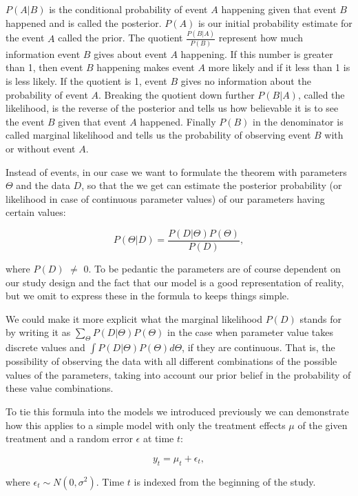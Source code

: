 \documentclass[12pt,a4paper,leqno]{report}
\theoremstyle{plain}
\theoremstyle{definition}
\theoremstyle{remark}
\begin{document}
\(P(A|B)\) is the conditional probability of event \(A\) happening given that event \(B\) happened and is
called the posterior. \(P(A)\) is our initial probability estimate for the event \(A\)
called the prior. The quotient \(\frac{P(B|A)}{P(B)}\) represent how much information
event \(B\) gives about event \(A\) happening. If this number is greater than 1,
then event \(B\) happening makes event \(A\) more likely and if it less than 1
is is less likely. If the quotient is 1, event \(B\) gives no information
about the probability of event \(A\).
Breaking the quotient down further \(P(B|A)\), called the likelihood, is the reverse of the posterior
and tells us how believable
it is to see the event \(B\) given that event \(A\) happened. Finally \(P(B)\) in the
denominator is called marginal likelihood and tells us the probability of observing
event \(B\) with or without event \(A\).

Instead of events, in our case we want to formulate the theorem with parameters \(\Theta \)
and the data \(D\), so that the we get can estimate the posterior
probability (or likelihood in case of continuous parameter values) of our parameters having certain values:

\begin{def}\label{}
\begin{equation}
P(\Theta|D) = \frac{P(D|\Theta)P(\Theta)}{P(D)},
\end{equation}
\end{def}where \(P(D)\) \(\neq \) 0. To be pedantic the parameters are of course dependent
on our study design and the fact that our model is a good representation of reality, but
we omit to express these in the formula to keeps things simple.

We could make it more explicit what the marginal likelihood \(P(D)\) stands for by
writing it as \(\sum_\Theta P(D|\Theta)P(\Theta)\) in the case when parameter value takes discrete values
and \(\int P(D|\Theta)P(\Theta) d\Theta \), if they are continuous. That is, the possibility of
observing the data with all different combinations of the possible values of the parameters,
taking into account our prior belief in the probability of these value combinations.

To tie this formula into the models we introduced previously we can demonstrate how this
applies to a simple model with only the treatment effects \(\mu \) of the given treatment
and a random error \(\epsilon \) at time \(t\):

\begin{def}\label{}
\begin{equation}\label{}
y_t = \mu_t + \epsilon_t,
\end{equation}
\end{def}where \(\epsilon_{t} \sim N(0,\sigma^2)\). Time \(t\) is indexed from the
beginning of the study.
\end{document}
